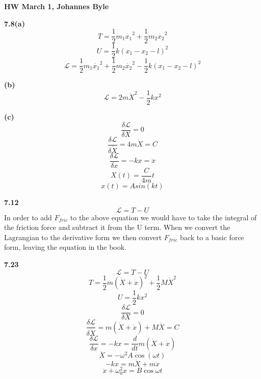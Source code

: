 \documentclass[english]{article}
\begin{document}
\begin{multicols*}{2}
\textbf{HW March 1, Johannes Byle}\\
\newcommand{\Lagr}{\mathcal{L}}

\noindent
\textbf{7.8(a)} $$T=\frac{1}{2}m_1\dot{x_1}^2+\frac{1}{2}m_2\dot{x_2}^2$$
$$U=\frac{1}{2}k(x_1-x_2-l)^2$$
$$\Lagr=\frac{1}{2}m_1\dot{x_1}^2+\frac{1}{2}m_2\dot{x_2}^2-\frac{1}{2}k(x_1-x_2-l)^2$$

\textbf{(b)} $$\Lagr=2m\dot{X}^2-\frac{1}{2}kx^2$$

\textbf{(c)} $$\frac{\delta\Lagr}{\delta X}=0$$
$$\frac{\delta\Lagr}{\delta \dot{X}}=4m\dot{X}=C$$
$$\frac{\delta\Lagr}{\delta x}=-kx=\ddot{x}$$
$$X(t)=\frac{C}{4m}t$$
$$x(t)=Asin(kt)$$

\noindent
\textbf{7.12} $$\Lagr=T-U$$
In order to add $F_{fric}$ to the above equation we would have to take the integral of the friction force and subtract it from the U term. When we convert the Lagrangian to the derivative form we then convert $F_{fric}$ back to a basic force form, leaving the equation in the book.

\noindent
\textbf{7.23} $$\Lagr=T-U$$
$$T=\frac{1}{2}m(\dot{X}+\dot{x})^2+\frac{1}{2}M\dot{X}^2$$
$$U=\frac{1}{2}kx^2$$
$$\frac{\delta\Lagr}{\delta X}=0$$
$$\frac{\delta\Lagr}{\delta \dot{X}}=m(\dot{X}+\dot{x})+M\dot{X}=C$$
$$\frac{\delta\Lagr}{\delta x}=-kx=\frac{d}{dt}m(\dot{X}+\dot{x})$$
$$\ddot{X}=-\omega^2A\cos(\omega t)$$
$$-kx=m\ddot{X}+m\ddot{x}$$
$$\ddot{x}+\omega_0^2x=B\cos\omega t$$
\end{multicols*}
\end{document}
